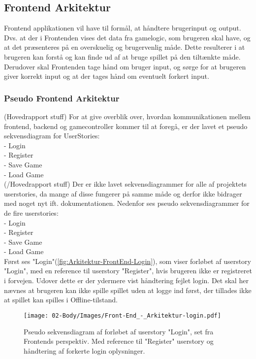 \subsection{Frontend Arkitektur}

Frontend applikationen vil have til formål, at håndtere brugerinput og output. Dvs. at der i Frontenden vises det data fra gamelogic, som brugeren skal have, og at det præsenteres på en overskuelig og brugervenlig måde. Dette resulterer i at brugeren kan forstå og kan finde ud af at bruge spillet på den tiltænkte måde.
Derudover skal Frontenden tage hånd om bruger input, og sørge for at brugeren giver korrekt input og at der tages hånd om eventuelt forkert input.

\subsubsection{Pseudo Frontend Arkitektur}
(Hovedrapport stuff)
For at give overblik over, hvordan kommunikationen mellem frontend, backend og gamecontroller kommer til at foregå, er der lavet et pseudo sekvensdiagram for UserStories:
\\
- Login\\
- Register\\
- Save Game\\
- Load Game\\
(/Hovedrapport stuff)
Der er ikke lavet sekvensdiagrammer for alle af projektets userstories, da mange af disse fungerer på samme måde og derfor ikke bidrager med noget nyt ift. dokumentationen.
Nedenfor ses pseudo sekvensdiagrammer for de fire userstories:\\
- Login\\
- Register\\
- Save Game\\
- Load Game\\

\noindent Først ses "Login"(\autoref{fig:Arkitektur-FrontEnd-Login}), som viser forløbet af userstory "Login", med en reference til userstory "Register", hvis brugeren ikke er registreret i forvejen. Udover dette er der ydermere vist håndtering fejlet login. Det skal her nævnes at brugeren kan ikke spille spillet uden at logge ind først, der tillades ikke at spillet kan spilles i Offline-tilstand.\\

\begin{figure}[h]
\centering
\texttt{[image: 02-Body/Images/Front-End\_-\_Arkitektur-login.pdf]}
\caption{Pseudo sekvensdiagram af forløbet af userstory "Login", set fra Frontends perspektiv. Med reference til "Register" userstory og håndtering af forkerte login oplysninger.}
\label{fig:Arkitektur-FrontEnd-Login}
\end{figure}

